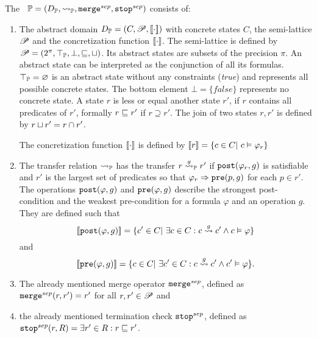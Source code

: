 The \predicateCPA\ $\mathbb{P} = (D_{\mathbb{P}}, \rightsquigarrow_{\mathbb{P}}, \texttt{merge}^{sep}, \texttt{stop}^{sep})$ consists of:
\begin{enumerate}[leftmargin=*, label=\arabic*.]
\item The abstract domain
	$D_{\mathbb{P}} = (C, \mathscr{P}, [\![ \cdot ]\!])$ with concrete states $C$, the semi-lattice $\mathscr{P}$ and the concretization function $[\![ \cdot ]\!]$.
	The semi-lattice is defined by $\mathscr{P} = (2^{\pi}, \top_{\mathbb{P}}, \bot, \sqsubseteq, \sqcup)$. Its abstract states are subsets of the precision $\pi$.
	An abstract state can be interpreted as the conjunction of all its formulas. $\top_{\mathbb{P}} = \varnothing$ is an abstract state without any constraints (\emph{true}) and represents all possible concrete states.
	The bottom element $\bot = \{false\}$ represents no concrete state. A state $r$ is less or equal another state $r'$, if $r$ contains all predicates of $r'$, formally $r \sqsubseteq r'$ if $r \supseteq r'$.
	The join of two states $r, r'$ is defined by $r \sqcup r' = r \cap r'$.

	The concretization function $[\![ \cdot ]\!]$ is defined by $[\![ r ]\!] = \{ c \in C |\ c \vDash \varphi_r\}$

\item The transfer relation $\rightsquigarrow_{\mathbb{P}}$ has the transfer $r \overset{g}{\rightsquigarrow}_{\mathbb{P}} r'$ if $\texttt{post}(\varphi_r, g)$ is satisfiable
	and $r'$ is the largest set of predicates so that $\varphi_r \Rightarrow \texttt{pre}(p, g)$ for each $p \in r'$.
	The operations $\texttt{post}(\varphi, g)$ and $\texttt{pre}(\varphi, g)$ describe the strongest post-condition and the weakest pre-condition for a formula $\varphi$ and an operation $g$.
	They are defined such that
	\[[\![ \texttt{post}(\varphi, g) ]\!] = \{c' \in C |\ \exists c \in C : c \overset{g}{\rightsquigarrow} c' \wedge c \vDash \varphi \}\] and
	\[[\![ \texttt{pre}(\varphi, g) ]\!] = \{c \in C |\ \exists c' \in C : c \overset{g}{\rightsquigarrow} c' \wedge c' \vDash \varphi \}.\]
\item The already mentioned merge operator $\texttt{merge}^{sep}$, defined as $\texttt{merge}^{sep}(r, r') = r'$ for all $r, r' \in \mathscr{P}$ and
\item the already mentioned termination check $\texttt{stop}^{sep}$, defined as $\texttt{stop}^{sep}(r, R) = \exists r' \in R : r \sqsubseteq r'$.
\end{enumerate}

